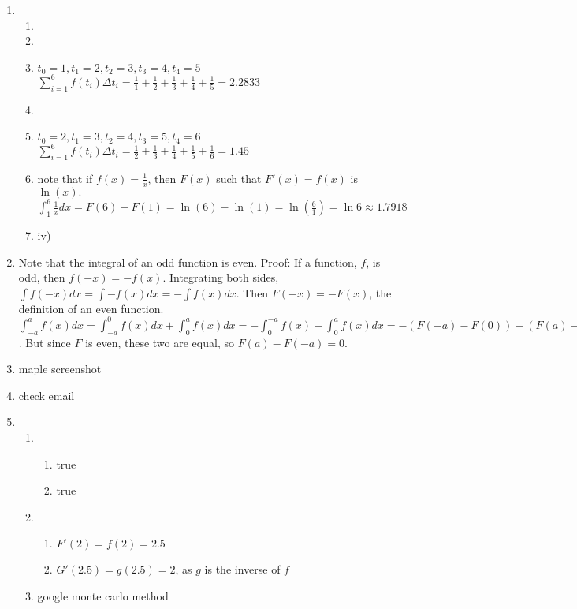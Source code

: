 \documentclass[10pt,english]{article}
\begin{document}
\begin{enumerate}
\item \begin{enumerate}
    \item  
    \item {}
    \item     $t_0=1,t_1=2,t_2=3,t_3=4,t_4=5$
    $\sum_{i=1}^6f(t_i)\Delta t_i=\frac{1}{1}+\frac{1}{2}+\frac{1}{3}+\frac{1}{4}+\frac{1}{5}=2.2833$
    \item  
    \item $t_0=2,t_1=3,t_2=4,t_3=5,t_4=6$
    $\sum_{i=1}^6f(t_i)\Delta t_i=\frac{1}{2}+\frac{1}{3}+\frac{1}{4}+\frac{1}{5}+\frac{1}{6}=1.45$
    \item note that if $f(x)=\frac{1}{x}$, then $F(x)$ such that $F'(x)=f(x)$ is $\ln(x). $ $\int_1^6\frac{1}{x}dx=F(6)-F(1)=\ln(6)-\ln(1)=\ln(\frac{6}{1})=\ln6\approx1.7918$
    \item iv)
\end{enumerate}


\item Note that the integral of an odd function is even. Proof:
    If a function, $f$, is odd, then $f(-x)=-f(x)$. Integrating both sides, $\int f(-x)dx=\int -f(x)dx=-\int f(x)dx$. Then $F(-x)=-F(x)$, the definition of an even function. \\ 
    $\int_{-a}^af(x)dx=\int_{-a}^0f(x)dx+\int_0^af(x)dx=-\int_0^{-a}f(x)+\int_0^af(x)dx=-(F(-a)-F(0))+(F(a)-F(0))=F(a)-F(-a)$. But since $F$ is even, these two are equal, so $F(a)-F(-a)=0$. 
    
\item maple screenshot

\item check email 

\item \begin{enumerate}
    \item \begin{enumerate}
        \item true
        \item true
    \end{enumerate}
    \item \begin{enumerate}
        \item $F'(2)=f(2)=2.5$
        \item $G'(2.5)=g(2.5)=2$, as $g$ is the inverse of $f$
    \end{enumerate}
    \item google monte carlo method
\end{enumerate}
\end{enumerate}
\end{document}
